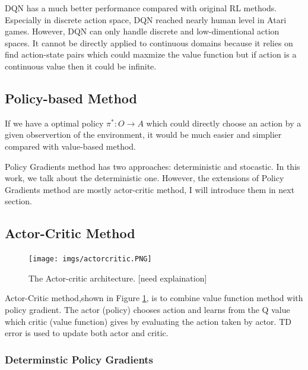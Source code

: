 \documentclass[11pt,twocolumn]{jarticle} %
\begin{document}
DQN has a much better performance compared with original RL methods. Especially in discrete action space, DQN reached nearly human level in Atari games. However, DQN can only handle discrete and low-dimentional action spaces. It cannot be directly applied to continuous domains because it relies on find action-state pairs which could maxmize the value function but if action is a continuous value then it could be infinite. \par

\subsection{Policy-based Method}
If we have a optimal policy $\pi^*: O \rightarrow A$ which could directly choose an action by a given observertion of the environment, it would be much easier and simplier compared with value-based method. \par
Policy Gradients method has two approaches: deterministic and stocastic. In this work, we talk about the deterministic one.
However, the extensions of Policy Gradients method are mostly actor-critic method, I will introduce them in next section. 


\subsection{Actor-Critic Method}
\begin{figure}[h]
 \begin{center}
  \texttt{[image: imgs/actorcritic.PNG]}
  \caption{
  The Actor-critic architecture. [need explaination]
  }
  \label{fig:actorcritic}
 \end{center}
\end{figure}
Actor-Critic method,shown in Figure \ref{fig:actorcritic}, is to combine value function method with policy gradient. The actor (policy) chooses action and learns from the Q value which critic (value function) gives by evaluating the action taken by actor. TD error is used to update both actor and critic.

\subsubsection{Determinstic Policy Gradients\cite{dpg}}
\end{document}
